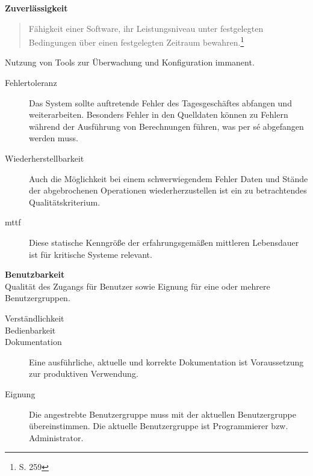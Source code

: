 \textbf{Zuverlässigkeit}
\begin{quote}
Fähigkeit einer Software, ihr Leistungsniveau unter festgelegten Bedingungen über einen festgelegten Zeitraum bewahren.\footnote{\cite{book:lehrbuchsoftware} S. 259}
\end{quote}
Nutzung von Tools zur Überwachung und Konfiguration immanent.
\begin{description}
\item[Fehlertoleranz] Das System sollte auftretende Fehler des Tagesgeschäftes abfangen und weiterarbeiten. Besonders Fehler in den Quelldaten können zu Fehlern während der Ausführung von Berechnungen führen, was per s\'{e} abgefangen werden muss.
\item[Wiederherstellbarkeit] Auch die Möglichkeit bei einem schwerwiegendem Fehler Daten und Stände der abgebrochenen Operationen wiederherzustellen ist ein zu betrachtendes Qualitätskriterium.
\item[\Gls{mttf}] Diese statische Kenngröße der erfahrungsgemäßen mittleren Lebensdauer ist für kritische Systeme relevant.
\end{description}



\textbf{Benutzbarkeit}\\
Qualität des Zugangs für Benutzer sowie Eignung für eine oder mehrere Benutzergruppen.
\begin{description}
\item[Verständlichkeit] 
\item[Bedienbarkeit] 
\item[Dokumentation] Eine ausführliche, aktuelle und korrekte Dokumentation ist Voraussetzung zur produktiven Verwendung.
\item[Eignung] Die angestrebte Benutzergruppe muss mit der aktuellen Benutzergruppe übereinstimmen. Die aktuelle Benutzergruppe ist Programmierer bzw. Administrator.
\end{description}



